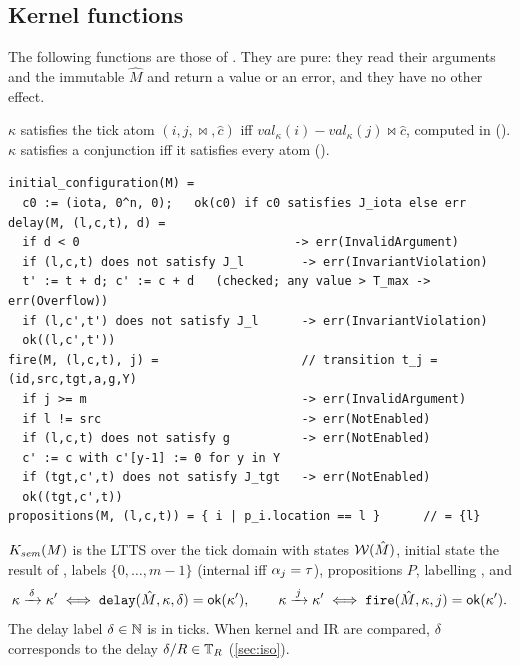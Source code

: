 \subsection{Kernel functions}

The following functions are those of . They are
pure: they read their arguments and the immutable $\hat M$ and return a value
or an error, and they have no other effect.

\begin{definition}\label{def:katom}
$\kappa$ satisfies the tick atom $(i,j,\bowtie,\hat c)$ iff
$\mathit{val}_\kappa(i)-\mathit{val}_\kappa(j)\bowtie\hat c$, computed in 
(). $\kappa$ satisfies a conjunction iff it satisfies every atom
().
\end{definition}

\begin{definition}\label{def:kfun}\leavevmode
\begin{lstlisting}
initial_configuration(M) =
  c0 := (iota, 0^n, 0);   ok(c0) if c0 satisfies J_iota else err
delay(M, (l,c,t), d) =
  if d < 0                              -> err(InvalidArgument)
  if (l,c,t) does not satisfy J_l        -> err(InvariantViolation)
  t' := t + d; c' := c + d   (checked; any value > T_max -> err(Overflow))
  if (l,c',t') does not satisfy J_l      -> err(InvariantViolation)
  ok((l,c',t'))
fire(M, (l,c,t), j) =                    // transition t_j = (id,src,tgt,a,g,Y)
  if j >= m                              -> err(InvalidArgument)
  if l != src                            -> err(NotEnabled)
  if (l,c,t) does not satisfy g          -> err(NotEnabled)
  c' := c with c'[y-1] := 0 for y in Y
  if (tgt,c',t) does not satisfy J_tgt   -> err(NotEnabled)
  ok((tgt,c',t))
propositions(M, (l,c,t)) = { i | p_i.location == l }      // = {l}
\end{lstlisting}
\end{definition}

\begin{definition}\label{def:ksem}
$K_{\mathit{sem}}(M)$ is the LTTS over the tick domain with states $\mathcal{W}(\hat M)$, initial state
the result of , labels $\{0,\dots,m-1\}$ (internal
iff $\alpha_j=\tau$), propositions $P$, labelling , and
\[
  \kappa\xrightarrow{\,\delta\,}\kappa' \iff \texttt{delay}(\hat M,\kappa,\delta)=\mathsf{ok}(\kappa'),
  \qquad
  \kappa\xrightarrow{\,j\,}\kappa' \iff \texttt{fire}(\hat M,\kappa,j)=\mathsf{ok}(\kappa').
\]
The delay label $\delta\in\mathbb{N}$ is in ticks. When kernel and IR are compared,
$\delta$ corresponds to the delay $\delta/R\in\mathbb{T}_R$ (\cref{sec:iso}).
\end{definition}

